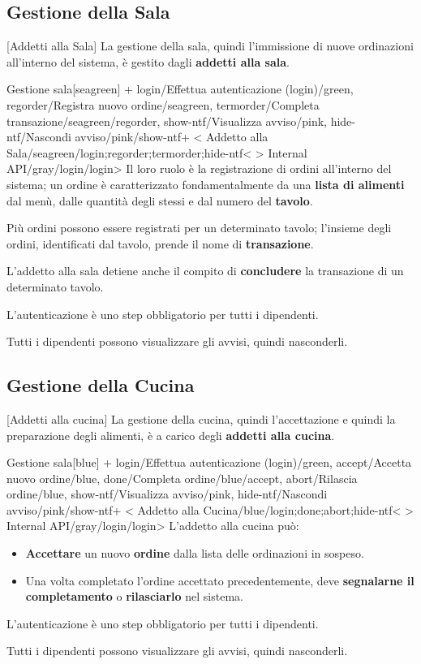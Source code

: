 \newpage
\subsection{Gestione della Sala}[Addetti alla Sala]
	La gestione della sala, quindi l'immissione di nuove ordinazioni all'interno del sistema, è gestito dagli \textbf{addetti alla sala}.
	\begin{ddusecase}{Gestione sala}[seagreen]
	+ {login/Effettua autenticazione (login)/green},
		{regorder/Registra nuovo ordine/seagreen},
		{termorder/Completa transazione/seagreen/regorder},
		{show-ntf/Visualizza avviso/pink},
		{hide-ntf/Nascondi avviso/pink/show-ntf}+
	<	{Addetto alla Sala/seagreen/login;regorder;termorder;hide-ntf}<
	> {Internal API/gray/login/login}>
		Il loro ruolo è la registrazione di ordini all'interno del sistema; un ordine è caratterizzato fondamentalmente 
		da una \textbf{lista di alimenti} dal menù, dalle quantità degli stessi e dal numero del \textbf{tavolo}.

		Più ordini possono essere registrati per un determinato tavolo; l'insieme degli ordini, identificati dal tavolo,
		prende il nome di \textbf{transazione}.

		L'addetto alla sala detiene anche il compito di \textbf{concludere} la transazione di un determinato tavolo.

		L'autenticazione è uno step obbligatorio per tutti i dipendenti.

		Tutti i dipendenti possono visualizzare gli avvisi, quindi nasconderli. 
	\end{ddusecase}

\subsection{Gestione della Cucina}[Addetti alla cucina]
	La gestione della cucina, quindi l'accettazione e quindi la preparazione degli alimenti, è a carico
	degli \textbf{addetti alla cucina}.
	\begin{ddusecase}{Gestione sala}[blue]
	+ {login/Effettua autenticazione (login)/green},
		{accept/Accetta nuovo ordine/blue},
		{done/Completa ordine/blue/accept},
		{abort/Rilascia ordine/blue},
		{show-ntf/Visualizza avviso/pink},
		{hide-ntf/Nascondi avviso/pink/show-ntf}+
	<	{Addetto alla Cucina/blue/login;done;abort;hide-ntf}<
	> {Internal API/gray/login/login}>{
	}
		L'addetto alla cucina può:
		\begin{itemize}
			\item \textbf{Accettare} un nuovo \textbf{ordine} dalla lista delle ordinazioni in sospeso.
			\item Una volta completato l'ordine accettato precedentemente, deve \textbf{segnalarne il completamento} o \textbf{rilasciarlo} nel sistema.
		\end{itemize}
		
		L'autenticazione è uno step obbligatorio per tutti i dipendenti.

		Tutti i dipendenti possono visualizzare gli avvisi, quindi nasconderli. 
	\end{ddusecase}

